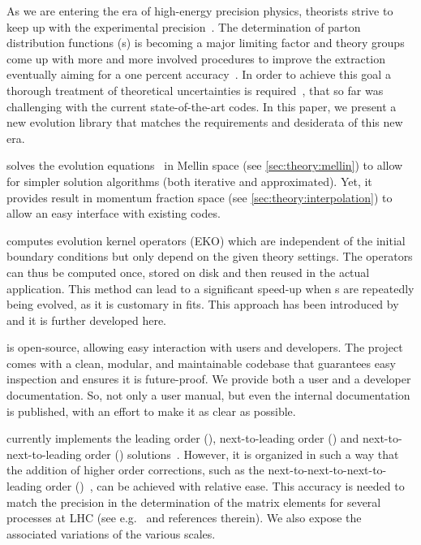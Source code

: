 As we are entering the era of high-energy precision physics, theorists strive
to keep up with the experimental precision~\cite{Gao:2017yyd}.
The determination of parton distribution functions (\pdf{}s) is becoming
a major limiting factor and theory groups come up with more and more
involved procedures to improve the extraction~\cite{NNPDF:2017mvq,Hou:2019efy,Bailey:2020ooq}
eventually aiming for a one percent accuracy~\cite{NNPDF:2021njg}.
In order to achieve this goal a thorough treatment of theoretical
uncertainties is required~\cite{AbdulKhalek:2019ihb},
that so far was challenging with the current
state-of-the-art codes.
In this paper, we present \eko{} a new \qcd{} evolution library that matches
the requirements and desiderata of this new era.

\eko{} solves the evolution
equations~\cite{Altarelli:1977zs,Gribov:1972ri,Dokshitzer:1977sg} in Mellin
space (see \cref{sec:theory:mellin}) to allow for simpler solution algorithms
(both iterative and approximated).
Yet, it provides result in momentum fraction space (see
\cref{sec:theory:interpolation}) to allow an easy interface with existing
codes.

\eko{} computes evolution kernel operators (EKO) which are independent of
the initial boundary conditions but only depend on the given theory settings.
The operators can thus be computed once, stored on disk and then reused in the
actual application. This method can lead to a significant speed-up when \pdf{}s
are repeatedly being evolved, as it is customary in \pdf{} fits.
This approach has been introduced by \fk{}~\cite{Ball:2008by,Ball:2010de,DelDebbio:2007ee}
and it is further developed here.

\eko{} is open-source, allowing easy interaction with users
and developers.
The project comes with a clean, modular, and maintainable codebase that guarantees
easy inspection and ensures it is future-proof.
We provide both a user and a developer documentation. So, not only a user
manual, but even the internal documentation is published, with an effort to make
it as clear as possible.

\eko{} currently implements the leading order (\lo{}),
next-to-leading order (\nlo{}) and next-to-next-to-leading order (\nnlo{})
solutions~\cite{Vogt:2004mw,Moch:2004pa,Blumlein:2021enk}.
However, it is organized in such a way that the addition of higher order corrections,
such as the next-to-next-to-next-to-leading order (\nnnlo{})~\cite{Moch:2021qrk},
can be achieved with relative ease.
This accuracy is needed to match the precision in the determination of the
matrix elements for several processes at LHC (see e.g.\ \cite{Duhr:2021vwj} and
references therein).
We also expose the associated variations of the various scales.

